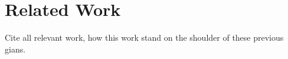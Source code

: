 \section{Related Work}
\label{sec:prior}

Cite all relevant work, how this work stand on the shoulder of these previous gians.

